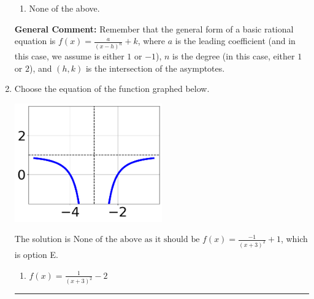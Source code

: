 \documentclass{extbook}[14pt]
\newcommand{\litem}[1]{\item #1

\rule{\textwidth}{0.4pt}}
\begin{document}
\begin{enumerate}
{\begin{enumerate}[label=\Alph*.]
\item None of the above.\end{enumerate}
\textbf{General Comment:} Remember that the general form of a basic rational equation is $ f(x) = \frac{a}{(x-h)^n} + k$, where $a$ is the leading coefficient (and in this case, we assume is either $1$ or $-1$), $n$ is the degree (in this case, either $1$ or $2$), and $(h, k)$ is the intersection of the asymptotes.
}
\litem{
Choose the equation of the function graphed below.

\begin{center}
    \includegraphics[width=0.5\textwidth]{../Figures/rationalGraphToEquationCopyA.png}
\end{center}


The solution is \( \text{None of the above as it should be } f(x) = \frac{-1}{(x + 3)^2} + 1 \), which is option E.\begin{enumerate}[label=\Alph*.]
\item \( f(x) = \frac{1}{(x + 3)^2} - 2 \)


\end{enumerate}}
\end{enumerate}
\end{document}
